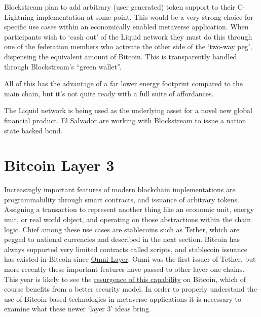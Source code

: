 Blockstream plan to add arbitrary (user generated) token support to their C-Lightning implementation at some point. This would be a very strong choice for specific use cases within an economically enabled metaverse application. When participants wish to `cash out' of the Liquid network they must do this through one of the federation members who activate the other side of the `two-way peg', dispensing the equivalent amount of Bitcoin. This is transparently handled through Blockstream's ``green wallet''.\par
All of this has the advantage of a far lower energy footprint compared to the main chain, but it's not quite ready with a full suite of affordances. \par
The Liquid network is being used as the underlying asset for a novel new global financial product. El Salvador are working with Blockstream to issue a nation state backed bond. 
\section{Bitcoin Layer 3}
Increasingly important features of modern blockchain implementations are programmability through smart contracts, and issuance of arbitrary tokens. Assigning a transaction to represent another thing like an economic unit, energy unit, or real world object, and operating on those abstractions within the chain logic. Chief among these use cases are stablecoins such as Tether, which are pegged to national currencies and described in the next section. Bitcoin has always supported very limited contracts called scripts, and stablecoin issuance has existed in Bitcoin since 
\href{https://www.omnilayer.org/}{Omni Layer}. Omni was the first issuer of Tether, but more recently these important features have passed to other layer one chains. This year is likely to see the \href{https://www.hiro.so/blog/bitcoin-ecosystem-a-guide-to-programming-languages-for-bitcoin-smart-contracts}{resurgence of this capability} on Bitcoin, which of course benefits from a better security model. In order to properly understand the use of Bitcoin based technologies in metaverse applications it is necessary to examine what these newer `layer 3' ideas bring. 
